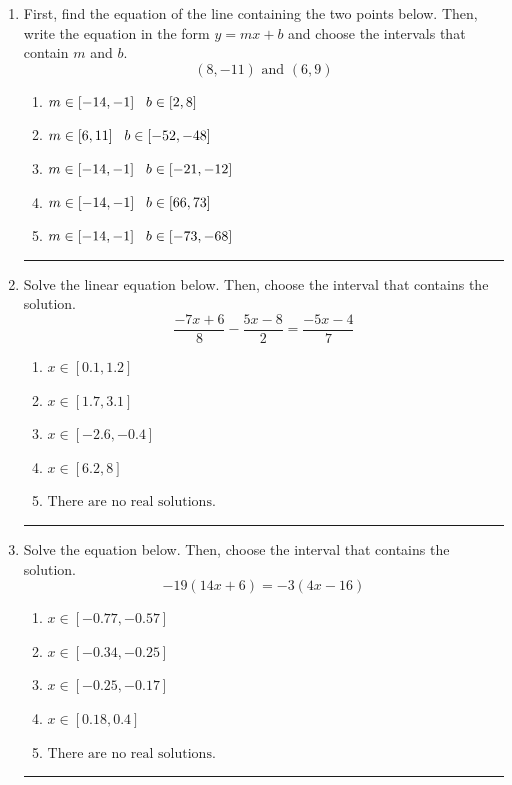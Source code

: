 \documentclass[14pt]{extbook}
\newcommand{\litem}[1]{\item#1\hspace*{-1cm}\rule{\textwidth}{0.4pt}}
\begin{document}
\begin{enumerate}
{\begin{enumerate}[label=\Alph*.]
\end{enumerate} }
\litem{
First, find the equation of the line containing the two points below. Then, write the equation in the form $ y=mx+b $ and choose the intervals that contain $m$ and $b$.\[ (8, -11) \text{ and } (6, 9) \]\begin{enumerate}[label=\Alph*.]
\item \( m \in [-14, -1] \hspace*{3mm} b \in [2, 8] \)
\item \( m \in [6, 11] \hspace*{3mm} b \in [-52, -48] \)
\item \( m \in [-14, -1] \hspace*{3mm} b \in [-21, -12] \)
\item \( m \in [-14, -1] \hspace*{3mm} b \in [66, 73] \)
\item \( m \in [-14, -1] \hspace*{3mm} b \in [-73, -68] \)

\end{enumerate} }
\litem{
Solve the linear equation below. Then, choose the interval that contains the solution.\[ \frac{-7x + 6}{8} - \frac{5x -8}{2} = \frac{-5x -4}{7} \]\begin{enumerate}[label=\Alph*.]
\item \( x \in [0.1, 1.2] \)
\item \( x \in [1.7, 3.1] \)
\item \( x \in [-2.6, -0.4] \)
\item \( x \in [6.2, 8] \)
\item \( \text{There are no real solutions.} \)

\end{enumerate} }
\litem{
Solve the equation below. Then, choose the interval that contains the solution.\[ -19(14x + 6) = -3(4x -16) \]\begin{enumerate}[label=\Alph*.]
\item \( x \in [-0.77, -0.57] \)
\item \( x \in [-0.34, -0.25] \)
\item \( x \in [-0.25, -0.17] \)
\item \( x \in [0.18, 0.4] \)
\item \( \text{There are no real solutions.} \)


\end{enumerate}}
\end{enumerate}
\end{document}
